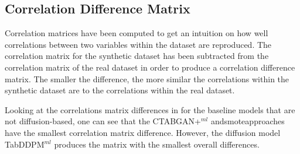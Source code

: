 \subsection{Correlation Difference Matrix}

Correlation matrices have been computed to get an intuition on how well correlations between two variables within the dataset are reproduced.
The correlation matrix for the synthetic dataset has been subtracted from the correlation matrix of the real dataset in order to produce a correlation difference matrix.
The smaller the difference, the more similar the correlations within the synthetic dataset are to the correlations within the real dataset.

Looking at the correlations matrix differences in  for the baseline models that are not diffusion-based, one can see that the CTABGAN+$^{ml}$ and\gls{smote}approaches have the smallest
correlation matrix difference.
However, the diffusion model TabDDPM$^{ml}$ produces the matrix with the smallest overall differences.


